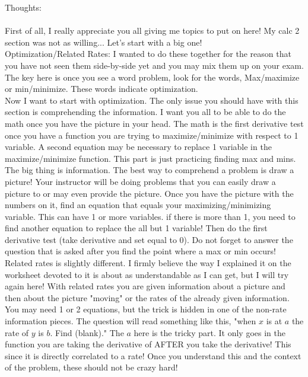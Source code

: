 \documentclass[10pt]{article}
\theoremstyle{Theorem}
\theoremstyle{definition}
\theoremstyle{remark}
\theoremstyle{custom}
\begin{document}
\thispagestyle{firststyle}
\pagestyle{plain}

Thoughts:\\\\
First of all, I really appreciate you all giving me topics to put on here! My calc 2 section was not as willing... Let's start with a big one!\\
Optimization/Related Rates: I wanted to do these together for the reason that you have not seen them side-by-side yet and you may mix them up on your exam. The key here is once you see a word problem, look for the words, Max/maximize or min/minimize. These words indicate optimization.\\
Now I want to start with optimization. The only issue you should have with this section is comprehending the information. I want you all to be able to do the math once you have the picture in your head. The math is the first derivative test once you have a function you are trying to maximize/minimize with respect to 1 variable. A second equation may be necessary to replace 1 variable in the maximize/minimize function. This part is just practicing finding max and mins. The big thing is information. The best way to comprehend a problem is draw a picture! Your instructor will be doing problems that you can easily draw a picture to or may even provide the picture. Once you have the picture with the numbers on it, find an equation that equals your maximizing/minimizing variable. This can have 1 or more variables. if there is more than 1, you need to find another equation to replace the all but 1 variable! Then do the first derivative test (take derivative and set equal to 0). Do not forget to answer the question that is asked after you find the point where a max or min occurs! \\
Related rates is slightly different. I firmly believe the way I explained it on the worksheet devoted to it is about as understandable as I can get, but I will try again here! With related rates you are given information about a picture and then about the picture "moving" or the rates of the already given information. You may need 1 or 2 equations, but the trick is hidden in one of the non-rate information pieces. The question will read something like this, "when $x$ is at $a$ the rate of $y$ is $b$. Find (blank)." The $a$ here is the tricky part. It only goes in the function you are taking the derivative of AFTER you take the derivative! This since it is directly correlated to a rate! Once you understand this and the context of the problem, these should not be crazy hard!\\
\end{document}
